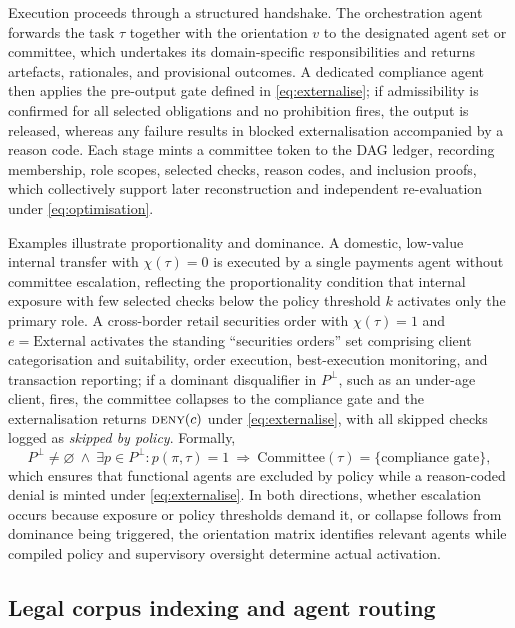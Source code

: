 \documentclass[oneside,10pt]{swissi}
\begin{document}
Execution proceeds through a structured handshake. The orchestration agent forwards the task \(\tau\) together with the orientation \(v\) to the designated agent set or committee, which undertakes its domain-specific responsibilities and returns artefacts, rationales, and provisional outcomes. A dedicated compliance agent then applies the pre-output gate defined in \eqref{eq:externalise}; if admissibility is confirmed for all selected obligations and no prohibition fires, the output is released, whereas any failure results in blocked externalisation accompanied by a reason code. Each stage mints a committee token to the DAG ledger, recording membership, role scopes, selected checks, reason codes, and inclusion proofs, which collectively support later reconstruction and independent re-evaluation under \eqref{eq:optimisation}.

Examples illustrate proportionality and dominance. A domestic, low-value internal transfer with \(\chi(\tau)=0\) is executed by a single payments agent without committee escalation, reflecting the proportionality condition that internal exposure with few selected checks below the policy threshold \(k\) activates only the primary role. A cross-border retail securities order with \(\chi(\tau)=1\) and \(e=\text{External}\) activates the standing “securities orders” set comprising client categorisation and suitability, order execution, best-execution monitoring, and transaction reporting; if a dominant disqualifier in \(P^{\perp}\), such as an under-age client, fires, the committee collapses to the compliance gate and the externalisation returns \(\textsc{deny}(c)\) under \eqref{eq:externalise}, with all skipped checks logged as \emph{skipped by policy}. Formally,
\begin{equation}
P^{\perp}\neq\varnothing \ \wedge\ \exists p\in P^{\perp}: p(\pi,\tau)=1
\ \Longrightarrow\
\mathrm{Committee}(\tau)=\{\text{compliance gate}\},
\label{eq:dominance}
\end{equation}
which ensures that functional agents are excluded by policy while a reason-coded denial is minted under \eqref{eq:externalise}. In both directions, whether escalation occurs because exposure or policy thresholds demand it, or collapse follows from dominance being triggered, the orientation matrix identifies relevant agents while compiled policy and supervisory oversight determine actual activation.

\subsection{Legal corpus indexing and agent routing}
\end{document}
